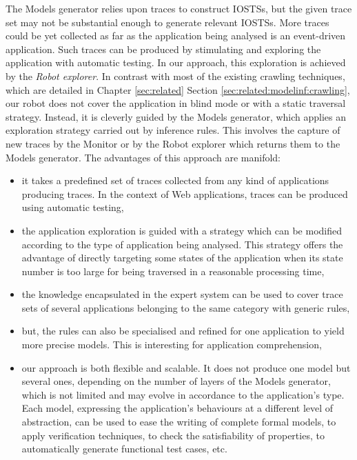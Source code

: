 The Models generator relies upon traces to construct IOSTSs, but
the given trace set may not be substantial enough to generate
relevant IOSTSs. More traces could be yet collected as far as
the application being analysed is an event-driven application.
Such traces can be produced by stimulating and exploring the
application with automatic testing. In our approach, this
exploration is achieved by the \emph{Robot explorer}. In contrast
with most of the existing crawling techniques, which are detailed
in Chapter \ref{sec:related} Section
\ref{sec:related:modelinf:crawling}, our robot does not cover the
application in blind mode or with a static traversal strategy.
Instead, it is cleverly guided by the Models generator, which
applies an exploration strategy carried out by inference rules.
This involves the capture of new traces by the Monitor or by the
Robot explorer which returns them to the Models generator. The
advantages of this approach are manifold:

\begin{itemize}
\item it takes a predefined set of traces collected from any kind
of applications producing traces. In the context of Web
applications, traces can be produced using automatic testing,

\item the application exploration is guided with a strategy which
can be modified according to the type of application being
analysed. This strategy offers the advantage of directly targeting
some states of the application when its state number is too large
for being traversed in a reasonable processing time,

\item the knowledge encapsulated in the expert system can be used
to cover trace sets of several applications belonging to the same
category with generic rules,

\item but, the rules can also be specialised and refined for one
application to yield more precise models. This is interesting for
application comprehension,

\item our approach is both flexible and scalable. It does not
produce one model but several ones, depending on the number of
layers of the Models generator, which is not limited and may
evolve in accordance to the application's type. Each model,
expressing the application's behaviours at a different level of
abstraction, can be used to ease the writing of complete formal
models, to apply verification techniques, to check the
satisfiability of properties, to automatically generate
functional test cases, etc.
\end{itemize}

